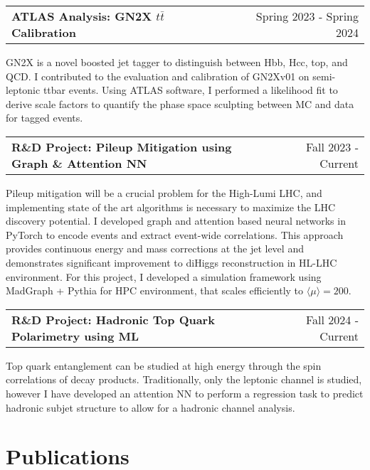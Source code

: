 \documentclass[a4paper,12pt]{article}
\makeatletter
\newenvironment{jobshort}[2]
    {
    \begin{tabularx}{\linewidth}{@{}l X r@{}}
    \textbf{#1} & \hfill &  #2 \\[3.75pt]
    \end{tabularx}
    }
    {
    }
\makeatother
\begin{document}
\begin{jobshort}{ATLAS Analysis: GN2X $t\bar{t}$ Calibration}{Spring 2023 - Spring 2024}
GN2X is a novel boosted jet tagger to distinguish between Hbb, Hcc, top, and QCD.
I contributed to the evaluation and calibration of GN2Xv01 on semi-leptonic ttbar events.
Using ATLAS software, I performed a likelihood fit to derive scale factors to quantify the phase space sculpting between MC and data for tagged events.
\end{jobshort}

\begin{jobshort}{R\&D Project: Pileup Mitigation using Graph \& Attention NN}{Fall 2023 - Current}
Pileup mitigation will be a crucial problem for the High-Lumi LHC, and implementing state of the art algorithms is necessary to maximize the LHC discovery potential.
I developed graph and attention based neural networks in PyTorch to encode events and extract event-wide correlations.
This approach provides continuous energy and mass corrections at the jet level and demonstrates significant improvement to diHiggs reconstruction in HL-LHC environment.
For this project, I developed a simulation framework using MadGraph + Pythia for HPC environment, that scales efficiently to $\langle \mu \rangle=200$.
\end{jobshort}

\begin{jobshort}{R\&D Project: Hadronic Top Quark Polarimetry using ML}{Fall 2024 - Current}
Top quark entanglement can be studied at high energy through the spin correlations of decay products. Traditionally, only the leptonic channel is studied, however I have developed an attention NN to perform a regression task to predict hadronic subjet structure to allow for a hadronic channel analysis.
\end{jobshort}

\section{Publications}
\begin{refsection}
\nocite{*}
\printbibliography[heading=none]
\end{refsection}

\end{document}
